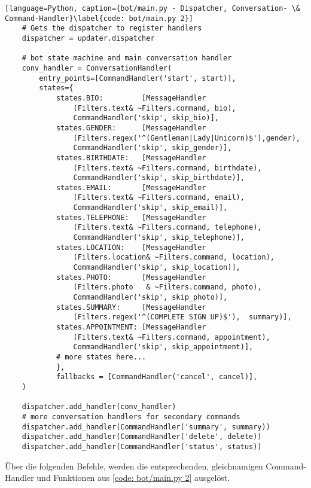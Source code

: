         \begin{lstlisting}[language=Python, caption={bot/main.py - Dispatcher, Conversation- \& Command-Handler}\label{code: bot/main.py 2}]
    # Gets the dispatcher to register handlers
    dispatcher = updater.dispatcher
    
    # bot state machine and main conversation handler
    conv_handler = ConversationHandler(
        entry_points=[CommandHandler('start', start)],
        states={
            states.BIO:         [MessageHandler
                (Filters.text& ~Filters.command, bio), 
                CommandHandler('skip', skip_bio)],
            states.GENDER:      [MessageHandler
                (Filters.regex('^(Gentleman|Lady|Unicorn)$'),gender), 
                CommandHandler('skip', skip_gender)],
            states.BIRTHDATE:   [MessageHandler
                (Filters.text& ~Filters.command, birthdate), 
                CommandHandler('skip', skip_birthdate)],
            states.EMAIL:       [MessageHandler
                (Filters.text& ~Filters.command, email), 
                CommandHandler('skip', skip_email)],
            states.TELEPHONE:   [MessageHandler
                (Filters.text& ~Filters.command, telephone), 
                CommandHandler('skip', skip_telephone)],
            states.LOCATION:    [MessageHandler
                (Filters.location& ~Filters.command, location), 
                CommandHandler('skip', skip_location)],
            states.PHOTO:       [MessageHandler
                (Filters.photo   & ~Filters.command, photo), 
                CommandHandler('skip', skip_photo)],
            states.SUMMARY:     [MessageHandler
                (Filters.regex('^(COMPLETE SIGN UP)$'),  summary)],
            states.APPOINTMENT: [MessageHandler
                (Filters.text& ~Filters.command, appointment), 
                CommandHandler('skip', skip_appointment)],
            # more states here...
            },
            fallbacks = [CommandHandler('cancel', cancel)],
    )

    dispatcher.add_handler(conv_handler)
    # more conversation handlers for secondary commands
    dispatcher.add_handler(CommandHandler('summary', summary))
    dispatcher.add_handler(CommandHandler('delete', delete))
    dispatcher.add_handler(CommandHandler('status', status))
        \end{lstlisting}

        Über die folgenden Befehle, werden die entsprechenden, gleichnamigen Command-Handler und Funktionen aus \ref*{code: bot/main.py 2} ausgelöst. 

